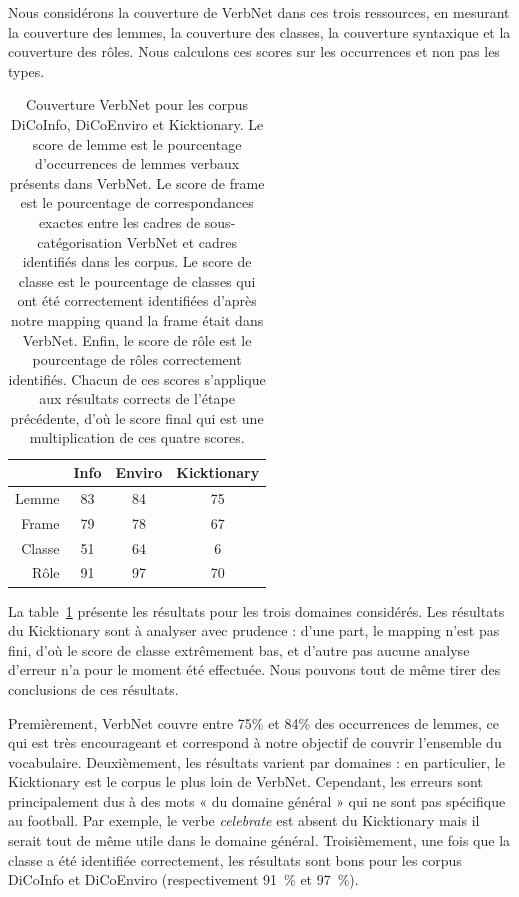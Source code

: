 Nous considérons la couverture de VerbNet dans ces trois ressources, en
mesurant la couverture des lemmes, la couverture des classes, la couverture
syntaxique et la couverture des rôles. Nous calculons ces scores sur les
occurrences et non pas les types.

\begin{table}[h]
\centering
\begin{tabular}{rccc}
  \toprule
         & Info & Enviro & Kicktionary \\
  \midrule
  Lemme  & 83 & 84 & 75 \\
  Frame  & 79 & 78 & 67 \\
  Classe & 51 & 64 & 6  \\
  Rôle   & 91 & 97 & 70 \\
  \bottomrule
\end{tabular}

\caption{\label{table:coverage} Couverture VerbNet pour les corpus DiCoInfo,
    DiCoEnviro et Kicktionary. Le score de lemme est le pourcentage
    d'occurrences de lemmes verbaux présents dans VerbNet. Le score de frame
    est le pourcentage de correspondances exactes entre les cadres de
    sous-catégorisation VerbNet et cadres identifiés dans les corpus. Le score
    de classe est le pourcentage de classes qui ont été correctement
    identifiées d'après notre mapping quand la frame était dans VerbNet. Enfin,
    le score de rôle est le pourcentage de rôles correctement identifiés.
    Chacun de ces scores s'applique aux résultats corrects de l'étape
    précédente, d'où le score final qui est une multiplication de ces quatre
    scores.}

\end{table}

La table~\ref{table:coverage} présente les résultats pour les trois domaines
considérés. Les résultats du Kicktionary sont à analyser avec prudence : d'une
part, le mapping n'est pas fini, d'où le score de classe extrêmement bas, et
d'autre pas aucune analyse d'erreur n'a pour le moment été effectuée. Nous
pouvons tout de même tirer des conclusions de ces résultats.

Premièrement, VerbNet couvre entre 75\% et 84\% des occurrences de lemmes, ce
qui est très encourageant et correspond à notre objectif de couvrir l'ensemble
du vocabulaire.
Deuxièmement, les résultats varient par domaines : en particulier, le
Kicktionary est le corpus le plus loin de VerbNet. Cependant, les erreurs sont
principalement dus à des mots « du domaine général » qui ne sont pas spécifique
au football. Par exemple, le verbe \textit{celebrate} est absent du Kicktionary
mais il serait tout de même utile dans le domaine général.
Troisièmement, une fois que la classe a été identifiée correctement, les
résultats sont bons pour les corpus DiCoInfo et DiCoEnviro (respectivement
91~\% et 97~\%).

